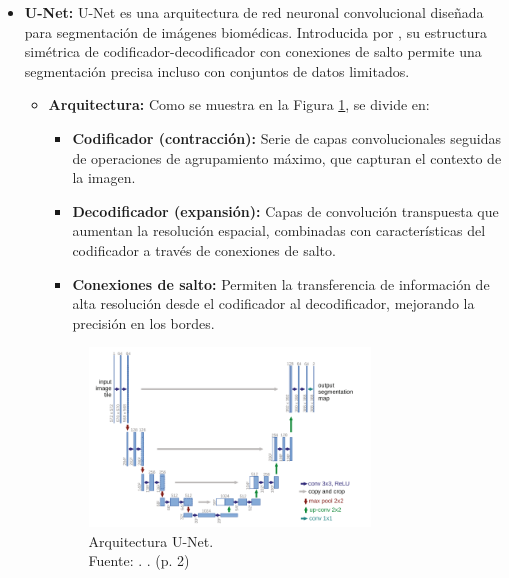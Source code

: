 \begin{itemize}
    \item \textbf{U-Net:} U-Net es una arquitectura de red neuronal convolucional diseñada para segmentación de imágenes biomédicas. Introducida por \cite{ronneberger2015}, su estructura simétrica de codificador-decodificador con conexiones de salto permite una segmentación precisa incluso con conjuntos de datos limitados. 
	\begin{itemize} 
\item \textbf{Arquitectura:} Como se muestra en la Figura \ref{2:unet}, se divide en:
\begin{itemize} 
\item \textbf{Codificador (contracción):}  Serie de capas convolucionales seguidas de operaciones de agrupamiento máximo, que capturan el contexto de la imagen. \parencite{ronneberger2015}
\item \textbf{Decodificador (expansión):} Capas de convolución transpuesta que aumentan la resolución espacial, combinadas con características del codificador a través de conexiones de salto. \parencite{ronneberger2015}
\item \textbf{Conexiones de salto:} Permiten la transferencia de información de alta resolución desde el codificador al decodificador, mejorando la precisión en los bordes. \parencite{ronneberger2015}
\end{itemize}

\begin{figure}[H]
		\begin{center}
			\includegraphics[width=0.75\textwidth]{2/figures/unet arq.png}
			\caption[Arquitectura U-Net]{Arquitectura U-Net.\\
			Fuente: \cite{ronneberger2015}. . (p. 2)}
			\label{2:unet}
		\end{center}
	\end{figure}


\end{itemize}
\end{itemize}
